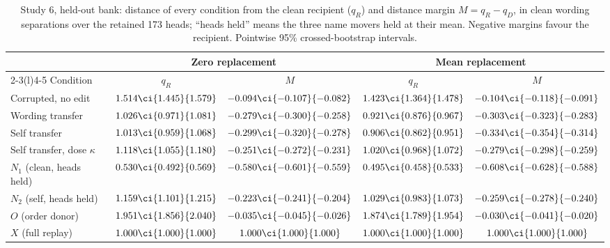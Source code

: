 \begin{table}[htbp]
\centering\small
\caption{Study 6, held-out bank: distance of every condition from the clean recipient ($q_R$) and distance margin $M = q_R - q_D$, in clean wording separations over the retained 173 heads; ``heads held'' means the three name movers held at their mean. Negative margins favour the recipient. Pointwise 95\% crossed-bootstrap intervals.}
\label{tab:positive-control-geometry}
\footnotesize\setlength{\tabcolsep}{3pt}
\begin{tabular}{@{}lcccc@{}}
\toprule
 & \multicolumn{2}{c}{Zero replacement} & \multicolumn{2}{c}{Mean replacement} \\
\cmidrule(lr){2-3}\cmidrule(l){4-5}
Condition & $q_R$ & $M$ & $q_R$ & $M$ \\
\midrule
Corrupted, no edit & $1.514\ci{1.445}{1.579}$ & $-0.094\ci{-0.107}{-0.082}$ & $1.423\ci{1.364}{1.478}$ & $-0.104\ci{-0.118}{-0.091}$ \\
Wording transfer & $1.026\ci{0.971}{1.081}$ & $-0.279\ci{-0.300}{-0.258}$ & $0.921\ci{0.876}{0.967}$ & $-0.303\ci{-0.323}{-0.283}$ \\
Self transfer & $1.013\ci{0.959}{1.068}$ & $-0.299\ci{-0.320}{-0.278}$ & $0.906\ci{0.862}{0.951}$ & $-0.334\ci{-0.354}{-0.314}$ \\
Self transfer, dose $\kappa$ & $1.118\ci{1.055}{1.180}$ & $-0.251\ci{-0.272}{-0.231}$ & $1.020\ci{0.968}{1.072}$ & $-0.279\ci{-0.298}{-0.259}$ \\
$N_1$ (clean, heads held) & $0.530\ci{0.492}{0.569}$ & $-0.580\ci{-0.601}{-0.559}$ & $0.495\ci{0.458}{0.533}$ & $-0.608\ci{-0.628}{-0.588}$ \\
$N_2$ (self, heads held) & $1.159\ci{1.101}{1.215}$ & $-0.223\ci{-0.241}{-0.204}$ & $1.029\ci{0.983}{1.073}$ & $-0.259\ci{-0.278}{-0.240}$ \\
$O$ (order donor) & $1.951\ci{1.856}{2.040}$ & $-0.035\ci{-0.045}{-0.026}$ & $1.874\ci{1.789}{1.954}$ & $-0.030\ci{-0.041}{-0.020}$ \\
$X$ (full replay) & $1.000\ci{1.000}{1.000}$ & $1.000\ci{1.000}{1.000}$ & $1.000\ci{1.000}{1.000}$ & $1.000\ci{1.000}{1.000}$ \\
\bottomrule
\end{tabular}
\end{table}

